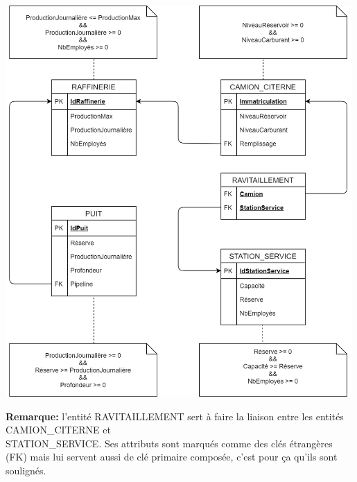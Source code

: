 \documentclass[a4paper]{article}
\begin{document}
\let\cleardoublepage\clearpage















\begin{center}
    \includegraphics[width=0.99\textwidth]{images/RoumacheGregoire_rel.png}
\end{center}

\textbf{Remarque:} l'entité RAVITAILLEMENT sert à faire la liaison entre les entités CAMION\_CITERNE et \\ STATION\_SERVICE. Ses attributs sont marqués comme des clés étrangères (FK) mais lui servent aussi de clé primaire composée, c'est pour ça qu'ils sont soulignés.
\end{document}
